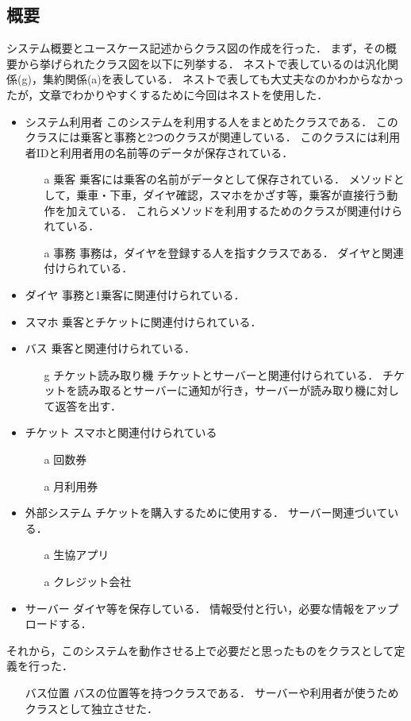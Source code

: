 \documentclass[documentclass]{jsarticle}
\begin{document}
\subsection*{概要}
システム概要とユースケース記述からクラス図の作成を行った．
まず，その概要から挙げられたクラス図を以下に列挙する．
ネストで表しているのは汎化関係(g)，集約関係(a)を表している．
ネストで表しても大丈夫なのかわからなかったが，文章でわかりやすくするために今回はネストを使用した．
\begin{itemize}
  \item システム利用者 このシステムを利用する人をまとめたクラスである．
  このクラスには乗客と事務と2つのクラスが関連している．
  このクラスには利用者IDと利用者用の名前等のデータが保存されている．
  \begin{itemize}
    \item[a] 乗客 乗客には乗客の名前がデータとして保存されている． 
    メソッドとして，乗車・下車，ダイヤ確認，スマホをかざす等，乗客が直接行う動作を加えている．
    これらメソッドを利用するためのクラスが関連付けられている．
    \item[a] 事務 事務は，ダイヤを登録する人を指すクラスである．
    ダイヤと関連付けられている．
  \end{itemize}
  \item ダイヤ 事務と1乗客に関連付けられている．
  \item スマホ 乗客とチケットに関連付けられている．
  \item バス 乗客と関連付けられている．
  \begin{itemize}
    \item[g] チケット読み取り機 チケットとサーバーと関連付けられている．
    チケットを読み取るとサーバーに通知が行き，サーバーが読み取り機に対して返答を出す．
  \end{itemize}
  \item チケット スマホと関連付けられている
  \begin{itemize}
    \item[a] 回数券
    \item[a] 月利用券
  \end{itemize}
  \item 外部システム チケットを購入するために使用する．
  サーバー関連づいている．
  \begin{itemize}
    \item[a] 生協アプリ
    \item[a] クレジット会社
  \end{itemize}
  \item サーバー ダイヤ等を保存している．
  情報受付と行い，必要な情報をアップロードする．
\end{itemize}
それから，このシステムを動作させる上で必要だと思ったものをクラスとして定義を行った．
\begin{itemize}
  \item[バス位置] バスの位置等を持つクラスである．
  サーバーや利用者が使うためクラスとして独立させた．   
\end{itemize}
\end{document}
